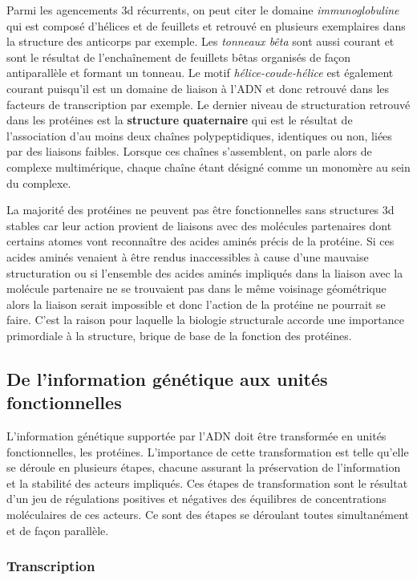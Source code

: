 Parmi les agencements 3d récurrents, on peut citer le domaine \textit{immunoglobuline} qui est composé d'hélices et de feuillets et retrouvé en plusieurs exemplaires dans la structure des anticorps par exemple. Les \textit{tonneaux bêta} sont aussi courant et sont le résultat de l’enchaînement de feuillets bêtas organisés de façon antiparallèle et formant un tonneau. Le motif \textit{hélice-coude-hélice} est également courant puisqu'il est un domaine de liaison à l'ADN et donc retrouvé dans les facteurs de transcription par exemple.
Le dernier niveau de structuration retrouvé dans les protéines est la \textbf{structure quaternaire} qui est le résultat de l'association d'au moins deux chaînes polypeptidiques, identiques ou non, liées par des liaisons faibles. Lorsque ces chaînes s'assemblent, on parle alors de complexe multimérique, chaque chaîne étant désigné comme un monomère au sein du complexe.

La majorité des protéines ne peuvent pas être fonctionnelles sans structures 3d stables car leur action provient de liaisons avec des molécules partenaires dont certains atomes vont reconnaître des acides aminés précis de la protéine. Si ces acides aminés venaient à être rendus inaccessibles à cause d'une mauvaise structuration ou si l'ensemble des acides aminés impliqués dans la liaison avec la molécule partenaire ne se trouvaient pas dans le même voisinage géométrique alors la liaison serait impossible et donc l'action de la protéine ne pourrait se faire. C'est la raison pour laquelle la biologie structurale accorde une importance primordiale à la structure, brique de base de la fonction des protéines.


\subsection{De l'information génétique aux unités fonctionnelles} \label{trans_trad}

L'information génétique supportée par l'ADN doit être transformée en unités fonctionnelles, les protéines. L'importance de cette transformation est telle qu'elle se déroule en plusieurs étapes, chacune assurant la préservation de l'information et la stabilité des acteurs impliqués. Ces étapes de transformation sont le résultat d'un jeu de régulations positives et négatives des équilibres de concentrations moléculaires de ces acteurs. Ce sont des étapes se déroulant toutes simultanément et de façon parallèle.

\subsubsection{Transcription}

